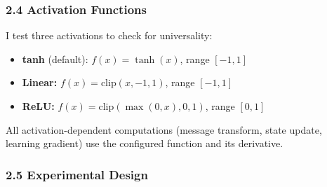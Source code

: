 \documentclass[
  11pt,
]{article}
\providecommand{\tightlist}{%
  \setlength{\itemsep}{0pt}\setlength{\parskip}{0pt}}
\begin{document}
\subsubsection{2.4 Activation Functions}\label{activation-functions}

I test three activations to check for universality:

\begin{itemize}
\tightlist
\item
  \textbf{tanh} (default): \(f(x) = \tanh(x)\), range \([-1, 1]\)
\item
  \textbf{Linear:} \(f(x) = \text{clip}(x, -1, 1)\), range \([-1, 1]\)
\item
  \textbf{ReLU:} \(f(x) = \text{clip}(\max(0, x), 0, 1)\), range
  \([0, 1]\)
\end{itemize}

All activation-dependent computations (message transform, state update,
learning gradient) use the configured function and its derivative.

\subsubsection{2.5 Experimental Design}\label{experimental-design}
\end{document}
